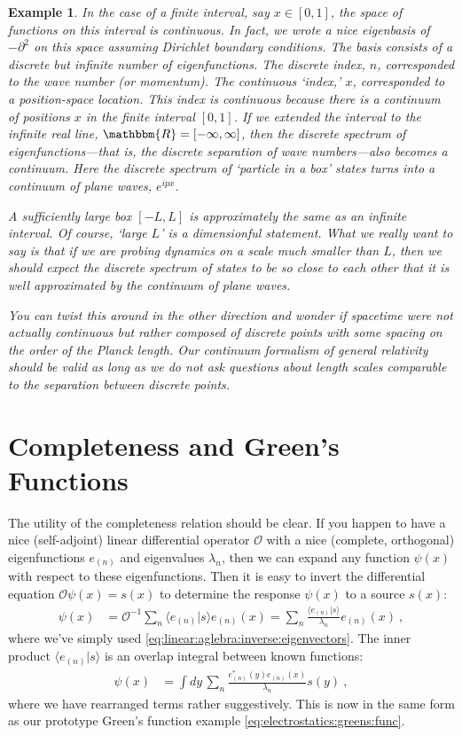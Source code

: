 \documentclass[
  11pt,
	colorful,
	raggedright,
]{tufte-style-thesis-flip}
\newtheorem{example}{Example}[section]
\begin{document}
\begin{example}
In the case of a finite interval, say $x\in [0,1]$, the space of functions on this interval is continuous. In fact, we wrote a nice eigenbasis of $-\partial^2$ on this space assuming Dirichlet boundary conditions. The basis consists of a discrete but infinite number of eigenfunctions. The discrete index, $n$, corresponded to the wave number (or momentum). The continuous `index,' $x$, corresponded to a position-space location. This index is continuous because there is a continuum of positions $x$ in the finite interval $[0,1]$. If we extended the interval to the infinite real line, $\mathbbm{R} = [-\infty, \infty]$, then the discrete spectrum of eigenfunctions---that is, the discrete separation of wave numbers---also becomes a continuum. Here the discrete spectrum of `particle in a box' states turns into a continuum of plane waves, $e^{ipx}$. 

A sufficiently large box $[-L,L]$ is approximately the same as an infinite interval. Of course, `large $L$' is a dimensionful statement. What we really want to say is that if we are probing dynamics on a scale much smaller than $L$, then we should expect the discrete spectrum of states to be so close to each other that it is well approximated by the continuum of plane waves. 

You can twist this around in the other direction and wonder if spacetime were not actually continuous but rather composed of discrete points with some spacing on the order of the Planck length. Our continuum formalism of general relativity should be valid as long as we do not ask questions about length scales comparable to the separation between discrete points. 
\end{example}

\section{Completeness and Green's Functions}

The utility of the completeness relation should be clear. If you happen to have a nice (self-adjoint) linear differential operator $\mathcal O$ with a nice (complete, orthogonal) eigenfunctions $e_{(n)}$ and eigenvalues $\lambda_n$, then we can expand any function $\psi(x)$ with respect to these eigenfunctions. Then it is easy to invert the differential equation $\mathcal O \psi(x) = s(x)$ to determine the response $\psi(x)$ to a source $s(x)$:
\begin{align}
  \psi(x) 
  &= \mathcal O^{-1}
  \sum_n \langle e_{(n)}|s\rangle e_{(n)}(x)
  = \sum_n \frac{\langle e_{(n)}|s\rangle}{\lambda_n} e_{(n)}(x) \ ,
\end{align}
where we've simply used \eqref{eq:linear:aglebra:inverse:eigenvectors}. The inner product $\langle e_{(n)}|s\rangle$ is an overlap integral between known functions:
\begin{align}
  \psi(x) &= 
   \int dy\, \sum_n \frac{e_{(n)}^*(y) e_{(n)}(x)}{\lambda_n} s(y) \ ,
   \label{eq:Greens:function:by:completeness}
\end{align}
where we have rearranged terms rather suggestively. This is now in the same form as our prototype Green's function example \eqref{eq:electrostatics:greens:func}. 
\end{document}
